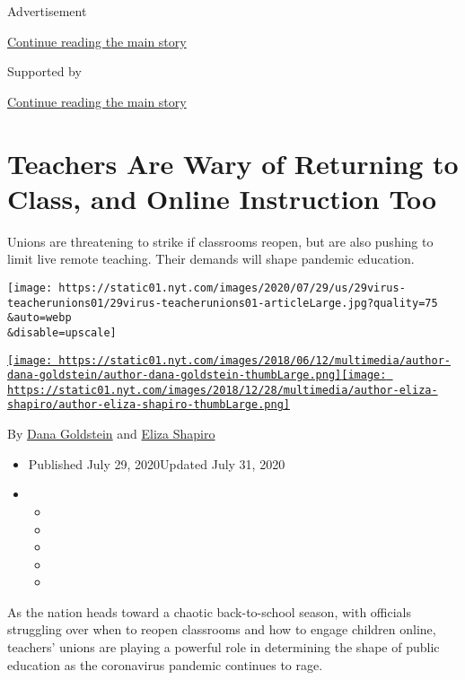 Advertisement

\protect\hyperlink{after-top}{Continue reading the main story}

Supported by

\protect\hyperlink{after-sponsor}{Continue reading the main story}

\hypertarget{teachers-are-wary-of-returning-to-class-and-online-instruction-too}{%
\section{Teachers Are Wary of Returning to Class, and Online Instruction
Too}\label{teachers-are-wary-of-returning-to-class-and-online-instruction-too}}

Unions are threatening to strike if classrooms reopen, but are also
pushing to limit live remote teaching. Their demands will shape pandemic
education.

\texttt{[image: https://static01.nyt.com/images/2020/07/29/us/29virus-teacherunions01/29virus-teacherunions01-articleLarge.jpg?quality=75\\\&auto=webp\\\&disable=upscale]}

\href{https://www.nytimes.com/by/dana-goldstein}{\texttt{[image: https://static01.nyt.com/images/2018/06/12/multimedia/author-dana-goldstein/author-dana-goldstein-thumbLarge.png]}}\href{https://www.nytimes.com/by/eliza-shapiro}{\texttt{[image: https://static01.nyt.com/images/2018/12/28/multimedia/author-eliza-shapiro/author-eliza-shapiro-thumbLarge.png]}}

By \href{https://www.nytimes.com/by/dana-goldstein}{Dana Goldstein} and
\href{https://www.nytimes.com/by/eliza-shapiro}{Eliza Shapiro}

\begin{itemize}
\item
  Published July 29, 2020Updated July 31, 2020
\item
  \begin{itemize}
  \item
  \item
  \item
  \item
  \item
  \end{itemize}
\end{itemize}

As the nation heads toward a chaotic back-to-school season, with
officials struggling over when to reopen classrooms and how to engage
children online, teachers' unions are playing a powerful role in
determining the shape of public education as the coronavirus pandemic
continues to rage.

